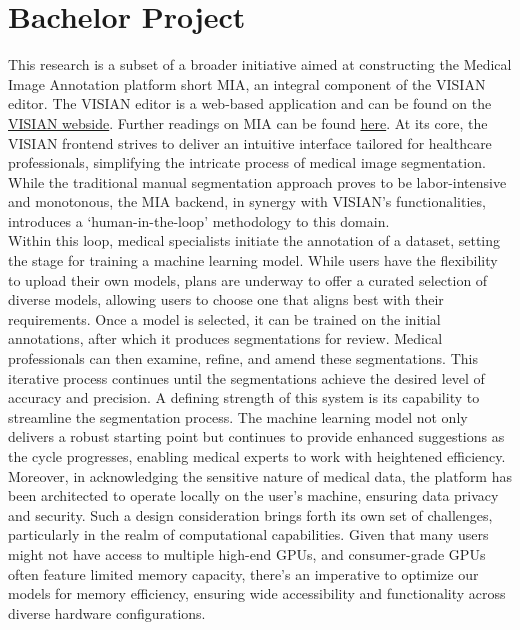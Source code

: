 \section{Bachelor Project}
This research is a subset of a broader initiative aimed at constructing the Medical Image Annotation platform short MIA, an integral component of the VISIAN editor.
The VISIAN editor is a web-based application and can be found on the \href{https://visian.org/}{VISIAN webside}. Further readings on MIA can be found \href{https://mia-ai.vercel.app/}{here}.
At its core, the VISIAN frontend strives to deliver an intuitive interface tailored for healthcare professionals, simplifying the intricate process of medical image segmentation.
While the traditional manual segmentation approach proves to be labor-intensive and monotonous, the MIA backend, in synergy with VISIAN's functionalities,
introduces a `human-in-the-loop' methodology to this domain.\\[1ex]
Within this loop, medical specialists initiate the annotation of a dataset, setting the stage for training a machine learning model. While users have the flexibility to upload their own models,
plans are underway to offer a curated selection of diverse models, allowing users to choose one that aligns best with their requirements. Once a model is selected, it can be trained on the initial
annotations, after which it produces segmentations for review. Medical professionals can then examine, refine, and amend these segmentations.
This iterative process continues until the segmentations achieve the desired level of accuracy and precision. A defining strength of this system is its capability to streamline the segmentation process.
The machine learning model not only delivers a robust starting point but continues to provide enhanced suggestions as the cycle progresses, enabling medical experts to work with heightened efficiency.\\[1ex]
Moreover, in acknowledging the sensitive nature of medical data, the platform has been architected to operate locally on the user's machine, ensuring data privacy and security.
Such a design consideration brings forth its own set of challenges, particularly in the realm of computational capabilities.
Given that many users might not have access to multiple high-end GPUs, and consumer-grade GPUs often feature limited memory capacity,
there's an imperative to optimize our models for memory efficiency, ensuring wide accessibility and functionality across diverse hardware configurations.

